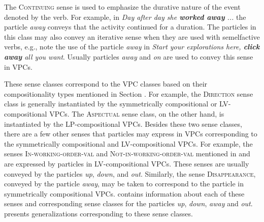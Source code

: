 \documentclass[output=paper
,modfonts
,nonflat]{langsci/langscibook}
\begin{document}
The \textsc{Continuing} sense is used to emphasize the durative nature of the event denoted by the verb. For example, in \textit{Day after day she \textbf{worked away} ...} the particle \textit{away} conveys that the activity continued for a duration. The particles in this class may also convey an iterative sense when they are used with semelfactive verbs, e.g., note the use of the particle \textit{away} in \textit{Start your explorations here, \textbf{click away} all you want}. Usually particles \textit{away} and \textit{on} are used to convey this sense in VPCs.

These sense classes correspond to the VPC classes based on their compositionality types mentioned in Section . For example, the \textsc{Direction} sense class is generally instantiated by the symmetrically compositional or LV-compositional VPCs. The \textsc{Aspectual} sense class, on the other hand, is instantiated by the LP-compositional VPCs. Besides these two sense classes, there are a few other senses that particles may express in VPCs corresponding to the symmetrically compositional and LV-compositional VPCs. For example, the senses \textsc{In-working-order-val} and \textsc{Not-in-working-order-val} mentioned in  and  are expressed by particles in LV-compositional VPCs. These senses are usually conveyed by the particles \textit{up}, \textit{down}, and \textit{out}. Similarly, the sense \textsc{Disappearance}, conveyed by the particle \textit{away}, may be taken to correspond to the particle %
in symmetrically compositional VPCs. %
 contains information about each of these senses and corresponding sense classes for the particles \textit{up}, \textit{down}, \textit{away} and \textit{out}.  presents generalizations corresponding to these sense classes. 
\end{document}
